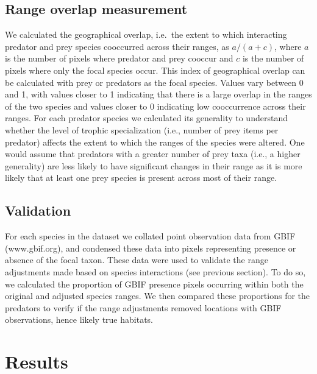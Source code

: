 \documentclass[11pt]{article}
\begin{document}
\hypertarget{range-overlap-measurement}{%
\subsection{Range overlap measurement}\label{range-overlap-measurement}}

We calculated the geographical overlap, i.e.~the extent to which
interacting predator and prey species cooccurred across their ranges, as
\(a/(a + c)\), where \(a\) is the number of pixels where predator and
prey cooccur and \(c\) is the number of pixels where only the focal
species occur. This index of geographical overlap can be calculated with
prey or predators as the focal species. Values vary between 0 and 1,
with values closer to 1 indicating that there is a large overlap in the
ranges of the two species and values closer to 0 indicating low
cooccurrence across their ranges. For each predator species we
calculated its generality to understand whether the level of trophic
specialization (i.e., number of prey items per predator) affects the
extent to which the ranges of the species were altered. One would assume
that predators with a greater number of prey taxa (i.e., a higher
generality) are less likely to have significant changes in their range
as it is more likely that at least one prey species is present across
most of their range.

\hypertarget{validation}{%
\subsection{Validation}\label{validation}}

For each species in the dataset we collated point observation data from
GBIF (www.gbif.org), and condensed these data into pixels representing
presence or absence of the focal taxon. These data were used to validate
the range adjustments made based on species interactions (see previous
section). To do so, we calculated the proportion of GBIF presence pixels
occurring within both the original and adjusted species ranges. We then
compared these proportions for the predators to verify if the range
adjustments removed locations with GBIF observations, hence likely true
habitats.

\hypertarget{results}{%
\section{Results}\label{results}}
\end{document}
